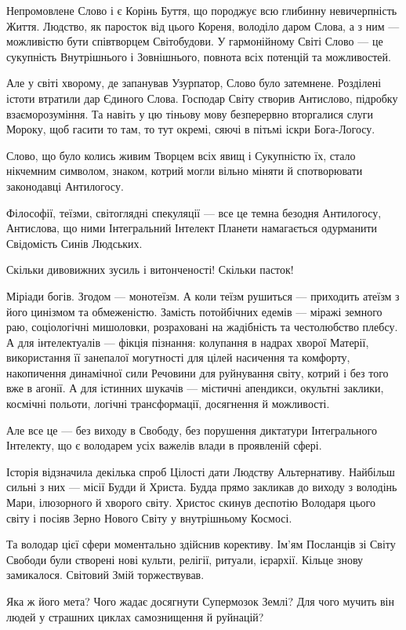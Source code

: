 Непромовлене Слово і є Корінь Буття, що породжує всю глибинну невичерпність
Життя. Людство, як паросток від цього Кореня, володіло даром Слова, а з ним —
можливістю бути співтворцем Світобудови. У гармонійному Світі Слово — це
сукупність Внутрішнього і Зовнішнього, повнота всіх потенцій та можливостей.

Але у світі хворому, де запанував Узурпатор, Слово було затемнене. Розділені
істоти втратили дар Єдиного Слова. Господар Світу створив Антислово, підробку
взаєморозуміння. Та навіть у цю тіньову мову безперервно вторгалися слуги
Мороку, щоб гасити то там, то тут окремі, сяючі в пітьмі іскри Бога-Логосу.

Слово, що було колись живим Творцем всіх явищ і Сукупністю їх, стало нікчемним
символом, знаком, котрий могли вільно міняти й спотворювати законодавці
Антилогосу.

Філософії, теїзми, світоглядні спекуляції — все це темна безодня Антилогосу,
Антислова, що ними Інтегральний Інтелект Планети намагається одурманити
Свідомість Синів Людських.

Скільки дивовижних зусиль і витонченості! Скільки пасток!

Міріади богів. Згодом — монотеїзм. А коли теїзм рушиться — приходить атеїзм з
його цинізмом та обмеженістю. Замість потойбічних едемів — міражі земного раю,
соціологічні мишоловки, розраховані на жадібність та честолюбство плебсу. А для
інтелектуалів — фікція пізнання: колупання в надрах хворої Матерії,
використання її занепалої могутності для цілей насичення та комфорту,
накопичення динамічної сили Речовини для руйнування світу, котрий і без того
вже в агонії. А для істинних шукачів — містичні апендикси, окультні заклики,
космічні польоти, логічні трансформації, досягнення й можливості.

Але все це — без виходу в Свободу, без порушення диктатури Інтегрального
Інтелекту, що є володарем усіх важелів влади в проявленій сфері.

Історія відзначила декілька спроб Цілості дати Людству Альтернативу. Найбільш
сильні з них — місії Будди й Христа. Будда прямо закликав до виходу з володінь
Мари, ілюзорного й хворого світу. Христос скинув деспотію Володаря цього світу
і посіяв Зерно Нового Світу у внутрішньому Космосі.

Та володар цієї сфери моментально здійснив корективу. Ім’ям Посланців зі Світу
Свободи були створені нові культи, релігії, ритуали, ієрархії. Кільце знову
замикалося. Світовий Змій торжествував.

Яка ж його мета? Чого жадає досягнути Супермозок Землі? Для чого мучить він
людей у страшних циклах самознищення й руйнацій?

